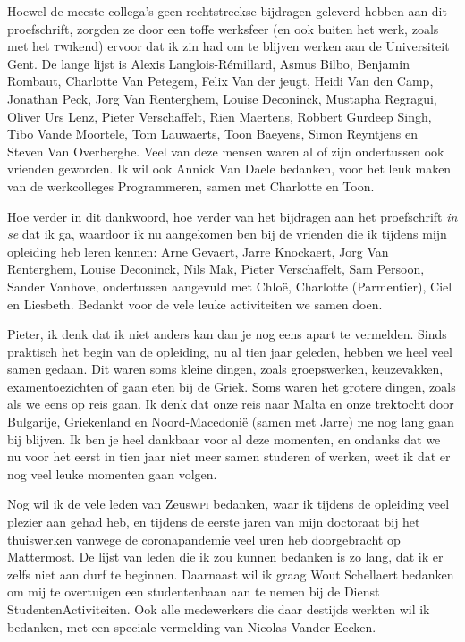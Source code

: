 \documentclass[main]{subfiles}
\begin{document}
Hoewel de meeste collega's geen rechtstreekse bijdragen geleverd hebben aan dit proefschrift, zorgden ze door een toffe werksfeer (en ook buiten het werk, zoals met het \textsc{twi}kend) ervoor dat ik zin had om te blijven werken aan de Universiteit Gent.
De lange lijst is Alexis Langlois-Rémillard, Asmus Bilbo, Benjamin Rombaut, Charlotte Van Petegem, Felix Van der jeugt, Heidi Van den Camp, Jonathan Peck, Jorg Van Renterghem, Louise Deconinck, Mustapha Regragui, Oliver Urs Lenz, Pieter Verschaffelt, Rien Maertens, Robbert Gurdeep Singh, Tibo Vande Moortele, Tom Lauwaerts, Toon Baeyens, Simon Reyntjens en Steven Van Overberghe.
Veel van deze mensen waren al of zijn ondertussen ook vrienden geworden.
Ik wil ook Annick Van Daele bedanken, voor het leuk maken van de werkcolleges Programmeren, samen met Charlotte en Toon.

Hoe verder in dit dankwoord, hoe verder van het bijdragen aan het proefschrift \textit{in se} dat ik ga, waardoor ik nu aangekomen ben bij de vrienden die ik tijdens mijn opleiding heb leren kennen: Arne Gevaert, Jarre Knockaert, Jorg Van Renterghem, Louise Deconinck, Nils Mak, Pieter Verschaffelt, Sam Persoon, Sander Vanhove, ondertussen aangevuld met Chloë, Charlotte (Parmentier), Ciel en Liesbeth.
Bedankt voor de vele leuke activiteiten we samen doen.

Pieter, ik denk dat ik niet anders kan dan je nog eens apart te vermelden.
Sinds praktisch het begin van de opleiding, nu al tien jaar geleden, hebben we heel veel samen gedaan.
Dit waren soms kleine dingen, zoals groepswerken, keuzevakken, examentoezichten of gaan eten bij de Griek.
Soms waren het grotere dingen, zoals als we eens op reis gaan.
Ik denk dat onze reis naar Malta en onze trektocht door Bulgarije, Griekenland en Noord-Macedonië (samen met Jarre) me nog lang gaan bij blijven.
Ik ben je heel dankbaar voor al deze momenten, en ondanks dat we nu voor het eerst in tien jaar niet meer samen studeren of werken, weet ik dat er nog veel leuke momenten gaan volgen.

Nog wil ik de vele leden van Zeus\textsc{wpi} bedanken, waar ik tijdens de opleiding veel plezier aan gehad heb, en tijdens de eerste jaren van mijn doctoraat bij het thuiswerken vanwege de coronapandemie veel uren heb doorgebracht op Mattermost.
De lijst van leden die ik zou kunnen bedanken is zo lang, dat ik er zelfs niet aan durf te beginnen.
Daarnaast wil ik graag Wout Schellaert bedanken om mij te overtuigen een studentenbaan aan te nemen bij de Dienst StudentenActiviteiten.
Ook alle medewerkers die daar destijds werkten wil ik bedanken, met een speciale vermelding van Nicolas Vander Eecken.
\end{document}
